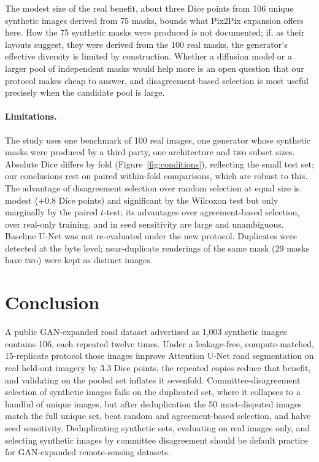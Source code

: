 \documentclass[11pt]{article}
\begin{document}
The modest size of the real benefit, about three Dice points from 106 unique synthetic images derived from 75 masks, bounds what Pix2Pix expansion offers here. How the 75 synthetic masks were produced is not documented; if, as their layouts suggest, they were derived from the 100 real masks, the generator's effective diversity is limited by construction. Whether a diffusion model or a larger pool of independent masks would help more is an open question that our protocol makes cheap to answer, and disagreement-based selection is most useful precisely when the candidate pool is large.

\paragraph{Limitations.} The study uses one benchmark of 100 real images, one generator whose synthetic masks were produced by a third party, one architecture and two subset sizes. Absolute Dice differs by fold (Figure~\ref{fig:conditions}), reflecting the small test set; our conclusions rest on paired within-fold comparisons, which are robust to this. The advantage of disagreement selection over random selection at equal size is modest ($+0.8$ Dice points) and significant by the Wilcoxon test but only marginally by the paired $t$-test; its advantages over agreement-based selection, over real-only training, and in seed sensitivity are large and unambiguous. Baseline U-Net was not re-evaluated under the new protocol. Duplicates were detected at the byte level; near-duplicate renderings of the same mask (29 masks have two) were kept as distinct images.

\section{Conclusion}

A public GAN-expanded road dataset advertised as 1{,}003 synthetic images contains 106, each repeated twelve times. Under a leakage-free, compute-matched, 15-replicate protocol those images improve Attention U-Net road segmentation on real held-out imagery by 3.3 Dice points, the repeated copies reduce that benefit, and validating on the pooled set inflates it sevenfold. Committee-disagreement selection of synthetic images fails on the duplicated set, where it collapses to a handful of unique images, but after deduplication the 50 most-disputed images match the full unique set, beat random and agreement-based selection, and halve seed sensitivity. Deduplicating synthetic sets, evaluating on real images only, and selecting synthetic images by committee disagreement should be default practice for GAN-expanded remote-sensing datasets.
\end{document}
